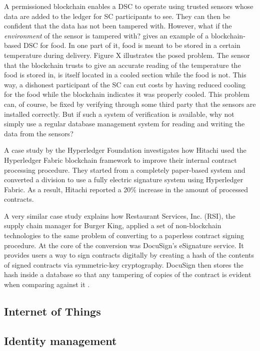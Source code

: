 A permissioned blockchain enables a DSC to operate using trusted
sensors whose data are added to the ledger for SC participants to see.
They can then be confident that the data has not been tampered with.
However, what if the \textit{environment} of the sensor is tampered
with? \cite{wustBlockchainNeed} gives an example of a blockchain-based
DSC for food. In one part of it, food is meant to be stored in a
certain temperature during delivery. Figure X illustrates the posed
problem. The sensor that the blockchain trusts to give an accurate
reading of the temperature the food is stored in, is itself located in
a cooled section while the food is not. This way, a dishonest
participant of the SC can cut costs by having reduced cooling for the
food while the blockchain indicates it was properly cooled. This
problem can, of course, be fixed by verifying through some third party
that the sensors are installed correctly. But if such a system of
verification is available, why not simply use a regular database
management system for reading and writing the data from the sensors?


A case study by the Hyperledger Foundation \cite{hyperledgerHitachi}
investigates how Hitachi used the Hyperledger Fabric blockchain framework
to improve their internal contract processing procedure. They started
from a completely paper-based system and converted a division to use
a fully electric signature system using Hyperledger Fabric. As a result,
Hitachi reported a 20\% increase in the amount of processed contracts.

A very similar case study \cite{docusignBurger} explains how
Restaurant Services, Inc. (RSI), the supply chain manager for Burger
King, applied a set of non-blockchain technologies to the same problem
of converting to a paperless contract signing procedure. At the core
of the conversion was DocuSign's eSignature service. It provides users
a way to sign contracts digitally by creating a hash of the contents of
signed contracts via symmetric-key cryptography. DocuSign then stores the hash inside a database so
that any tampering of copies of the contract is evident when comparing
against it \cite{docusignHow}.



\subsection{Internet of Things}

\subsection{Identity management}

\subsection{}